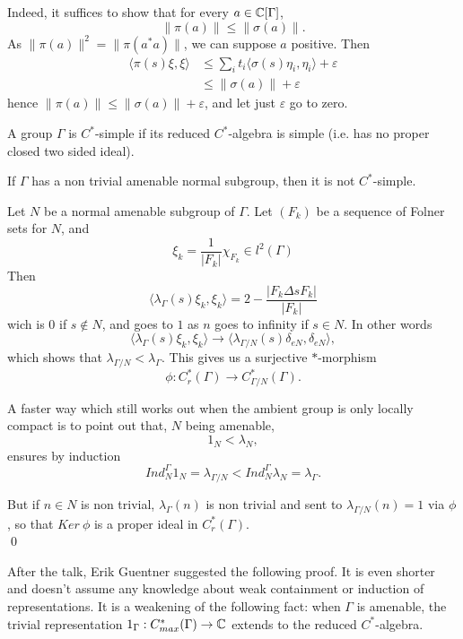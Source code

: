 Indeed, it suffices to show that for every $a\in \mathbb C [\Gamma]$, \[ \| \pi(a)\| \leq \| \sigma(a)\|. \]
As $\| \pi(a)\|^2 = \| \pi(a^*a)\|$, we can suppose $a$ positive. Then
\[\begin{split}
 \langle \pi(s)\xi, \xi\rangle  & \leq   \sum_i t_i \langle \sigma (s)\eta_i,\eta_i \rangle +\varepsilon \\
				& \leq \| \sigma(a)\|+ \varepsilon
\end{split}\]
hence $\| \pi(a)\| \leq \| \sigma(a)\| +\varepsilon$, and let just $\varepsilon $ go to zero.

\begin{definition}
A group $\Gamma$ is $C^*$-simple if its reduced $C^*$-algebra is simple (i.e. has no proper closed two sided ideal).
\end{definition}

\begin{thm}
If $\Gamma $ has a non trivial amenable normal subgroup, then it is not $C^*$-simple.
\end{thm}

\begin{dem}
Let $N$ be a normal amenable subgroup of $\Gamma$. Let $(F_k)$ be a sequence of Folner sets for $N$, and 
\[\xi_k =\frac{1}{|F_k|}\chi_{F_k}\in l^2(\Gamma)\]
Then
\[\langle \lambda_\Gamma(s)\xi_k, \xi_k\rangle = 2- \frac{|F_k \Delta sF_k |}{|F_k|} \]
wich is $0$ if $s\notin N$, and goes to $1$ as $n$ goes to infinity if $s\in N$. In other words
\[\langle \lambda_\Gamma(s)\xi_k, \xi_k\rangle \rightarrow \langle \lambda_{\Gamma/N}(s)\delta_{eN} , \delta_{eN} \rangle,\]
which shows that $\lambda_{\Gamma / N} < \lambda_\Gamma$. This gives us a surjective $*$-morphism 
\[\phi : C^*_r(\Gamma)\rightarrow C^*_{\Gamma/N}(\Gamma).\]

A faster way which still works out when the ambient group is only locally compact is to point out that, $N$ being amenable, 
\[1_N < \lambda_N,\]
ensures by induction 
\[Ind_N^\Gamma 1_N = \lambda_{\Gamma / N} < Ind_N^\Gamma \lambda_N= \lambda_{\Gamma }.\]

But if $n\in N$ is non trivial, $\lambda_{\Gamma}(n)$ is non trivial and sent to $\lambda_{\Gamma /N}(n) = 1$ via $\phi$, so that $Ker\ \phi$ is a proper ideal in $C^*_r(\Gamma)$.\\	
\qed	 
\end{dem}

After the talk, Erik Guentner suggested the following proof. It is even shorter and doesn't assume any knowledge about weak containment or induction of representations. It is a weakening of the following fact: when $\Gamma$ is amenable, the trivial representation $1_\Gamma : C^*_{max}(\Gamma)\rightarrow \mathbb C$ extends to the reduced $C^*$-algebra.\\

